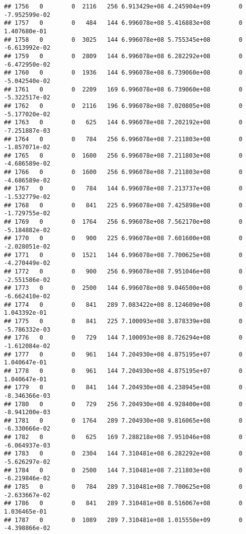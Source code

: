 \documentclass[
]{article}
\begin{document}
\begin{enumerate}
\begin{verbatim}
## 1756   0        0  2116   256 6.913429e+08 4.245904e+09        0 -7.952599e-02
## 1757   0        0   484   144 6.996078e+08 5.416883e+08        0  1.407680e-01
## 1758   0        0  3025   144 6.996078e+08 5.755345e+08        0 -6.613992e-02
## 1759   0        0  2809   144 6.996078e+08 6.282292e+08        0 -6.472950e-02
## 1760   0        0  1936   144 6.996078e+08 6.739060e+08        0 -5.042540e-02
## 1761   0        0  2209   169 6.996078e+08 6.739060e+08        0 -5.322517e-02
## 1762   0        0  2116   196 6.996078e+08 7.020805e+08        0 -5.177020e-02
## 1763   0        0   625   144 6.996078e+08 7.202192e+08        0 -7.251887e-03
## 1764   0        0   784   256 6.996078e+08 7.211803e+08        0 -1.857071e-02
## 1765   0        0  1600   256 6.996078e+08 7.211803e+08        0 -4.686589e-02
## 1766   0        0  1600   256 6.996078e+08 7.211803e+08        0 -4.686589e-02
## 1767   0        0   784   144 6.996078e+08 7.213737e+08        0 -1.532779e-02
## 1768   0        0   841   225 6.996078e+08 7.425898e+08        0 -1.729755e-02
## 1769   0        0  1764   256 6.996078e+08 7.562170e+08        0 -5.184882e-02
## 1770   0        0   900   225 6.996078e+08 7.601600e+08        0 -2.028051e-02
## 1771   0        0  1521   144 6.996078e+08 7.700625e+08        0 -4.270449e-02
## 1772   0        0   900   256 6.996078e+08 7.951046e+08        0 -2.551586e-02
## 1773   0        0  2500   144 6.996078e+08 9.046500e+08        0 -6.662410e-02
## 1774   0        0   841   289 7.083422e+08 8.124609e+08        0  1.043392e-01
## 1775   0        0   841   225 7.100093e+08 3.878339e+08        0 -5.786332e-03
## 1776   0        0   729   144 7.100093e+08 8.726294e+08        0 -1.612084e-02
## 1777   0        0   961   144 7.204930e+08 4.875195e+07        0  1.040647e-01
## 1778   0        0   961   144 7.204930e+08 4.875195e+07        0  1.040647e-01
## 1779   0        0   841   144 7.204930e+08 4.238945e+08        0 -8.346366e-03
## 1780   0        0   729   256 7.204930e+08 4.928400e+08        0 -8.941200e-03
## 1781   0        0  1764   289 7.204930e+08 9.816065e+08        0 -6.330666e-02
## 1782   0        0   625   169 7.288218e+08 7.951046e+08        0 -6.064937e-03
## 1783   0        0  2304   144 7.310481e+08 6.282292e+08        0 -5.626297e-02
## 1784   0        0  2500   144 7.310481e+08 7.211803e+08        0 -6.219846e-02
## 1785   0        0   784   289 7.310481e+08 7.700625e+08        0 -2.633667e-02
## 1786   0        0   841   289 7.310481e+08 8.516067e+08        0  1.036465e-01
## 1787   0        0  1089   289 7.310481e+08 1.015550e+09        0 -4.398866e-02

\end{verbatim}
\end{enumerate}
\end{document}

